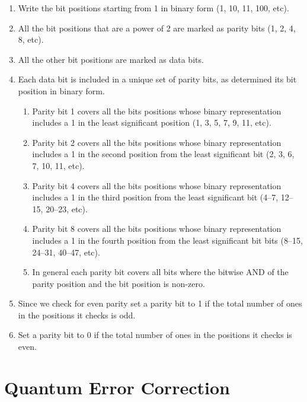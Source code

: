 \documentclass[12pt]{report}
\begin{document}
\begin{enumerate}
\item Write the bit positions starting from 1 in binary form (1, 10, 11, 100, etc).
\item All the bit positions that are a power of 2 are marked as parity bits (1, 2, 4, 8, etc).
\item All the other bit positions are marked as data bits.
\item Each data bit is included in a unique set of parity bits, as determined its bit position in binary form.\begin{enumerate}
\item Parity bit 1 covers all the bits positions whose binary representation includes a 1 in the least significant position (1, 3, 5, 7, 9, 11, etc).
\item Parity bit 2 covers all the bits positions whose binary representation includes a 1 in the second position from the least significant bit (2, 3, 6, 7, 10, 11, etc).
\item Parity bit 4 covers all the bits positions whose binary representation includes a 1 in the third position from the least significant bit (4–7, 12–15, 20–23, etc).
\item Parity bit 8 covers all the bits positions whose binary representation includes a 1 in the fourth position from the least significant bit bits (8–15, 24–31, 40–47, etc).
\item In general each parity bit covers all bits where the bitwise AND of the parity position and the bit position is non-zero.\end{enumerate}
\item Since we check for even parity set a parity bit to 1 if the total number of ones in the positions it checks is odd.
\item Set a parity bit to 0 if the total number of ones in the positions it checks is even.
\end{enumerate}
\section{Quantum Error Correction}
\end{document}

